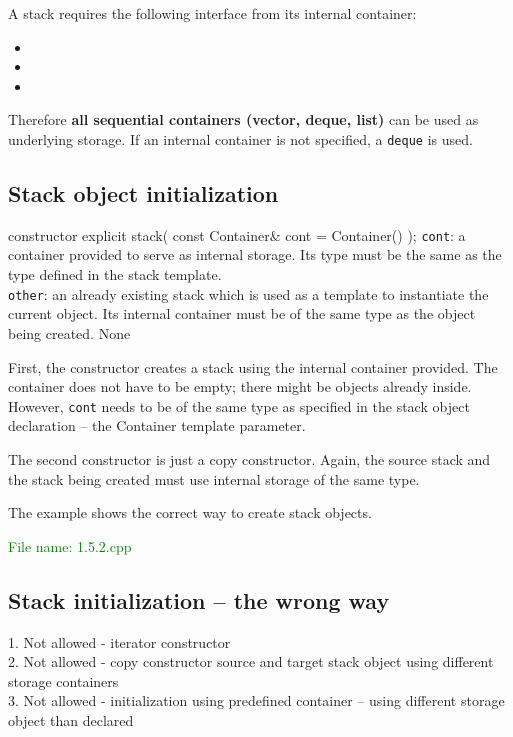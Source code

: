 A stack requires the following interface from its internal container:
\begin{itemize}
    \item {}
    \item {}
    \item {} 
\end{itemize}
Therefore \textbf{all sequential containers (vector,  deque, list)} can be used as underlying storage. 
If an internal container is not specified, a \texttt{deque} is used.

\subsection{Stack object initialization} %
\begin{methodinfo}
  {constructor}
  {explicit stack( const Container\& cont = Container() );}
  {\texttt{cont}: a container provided to serve as internal storage. Its type must be the same as the type defined
  in the stack template.\\
  \texttt{other}: an already existing stack which is used as a template to instantiate the current object. 
  Its internal container must be of the same type as the object being created.}
  {None}
  {First, the constructor creates a stack using the internal container provided. The container does not have 
  to be empty; there might be objects already inside. However, \texttt{cont} needs to be of the same type as 
  specified in the stack object declaration – the Container template parameter.
  
  The second constructor is just a copy constructor. Again, the source stack and the stack being created 
  must use internal storage of the same type.}
\end{methodinfo}
The example shows the correct way to create stack objects.

\textcolor{green}{File name: 1.5.2.cpp}


\subsection{Stack initialization – the wrong way} %
1. Not allowed - iterator constructor \\
2. Not allowed - copy constructor source and target stack object using different storage containers \\
3. Not allowed - initialization using predefined container – using different storage object than declared

